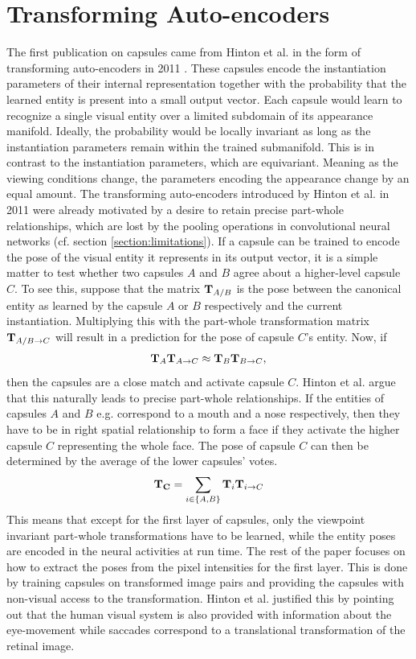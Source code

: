 \section{Transforming Auto-encoders}
The first publication on capsules came from Hinton et al. in the form of transforming auto-encoders in 2011 \cite{hinton2011transforming}. These capsules encode the instantiation parameters of their internal representation together with the probability that the learned entity is present into a small output vector. Each capsule would learn to recognize a single visual entity over a limited subdomain of its appearance manifold. Ideally, the probability would be locally invariant as long as the instantiation parameters remain within the trained submanifold. This is in contrast to the instantiation parameters, which are equivariant. Meaning as the viewing conditions change, the parameters encoding the appearance change by an equal amount.
The transforming auto-encoders introduced by Hinton et al. in 2011 were already motivated by a desire to retain precise part-whole relationships, which are lost by the pooling operations in convolutional neural networks (cf. section \ref{section:limitations}). If a capsule can be trained to encode the pose of the visual entity it represents in its output vector, it is a simple matter to test whether two capsules $A$ and $B$ agree about a higher-level capsule $C$. To see this, suppose that the matrix $\vb{T}_{A/B}$ is the pose between the canonical entity as learned by the capsule $A$ or $B$ respectively and the current instantiation. Multiplying this with the part-whole transformation matrix $\vb{T}_{A/B\rightarrow C}$ will result in a prediction for the pose of capsule $C$'s entity. Now, if
\begin{align}
    \vb{T}_A\vb{T}_{A\rightarrow C} \approx \vb{T}_B\vb{T}_{B\rightarrow C},
\end{align}
then the capsules are a close match and activate capsule $C$. Hinton et al. argue that this naturally leads to precise part-whole relationships. If the entities of capsules $A$ and $B$ e.g. correspond to a mouth and a nose respectively, then they have to be in right spatial relationship to form a face if they activate the higher capsule $C$ representing the whole face. The pose of capsule $C$ can then be determined by the average of the lower capsules' votes.
\begin{align}
    \vb{T_C} = \sum_{i\in \{A, B\}} \vb{T}_i\vb{T}_{i\rightarrow C}
\end{align}
This means that except for the first layer of capsules, only the viewpoint invariant part-whole transformations have to be learned, while the entity poses are encoded in the neural activities at run time. The rest of the paper focuses on how to extract the poses from the pixel intensities for the first layer. This is done by training capsules on transformed image pairs and providing the capsules with non-visual access to the transformation. Hinton et al. justified this by pointing out that the human visual system is also provided with information about the eye-movement while saccades correspond to a translational transformation of the retinal image. 
